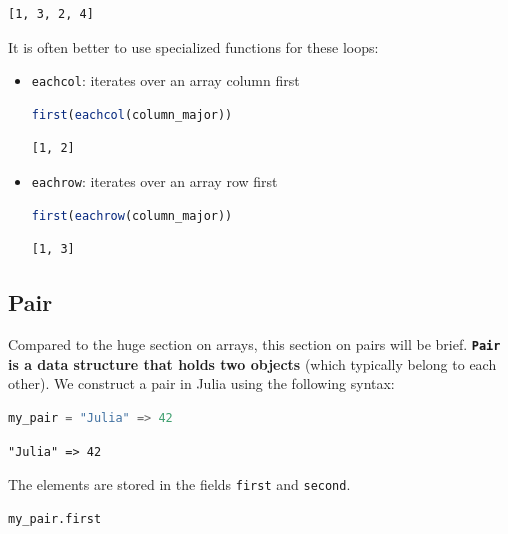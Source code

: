 \documentclass[
  notoc %
]{tufte-book}
\newcommand{\passthrough}[1]{#1}
\begin{document}
\begin{lstlisting}[language=Output]
[1, 3, 2, 4]
\end{lstlisting}

It is often better to use specialized functions for these loops:

\begin{itemize}
\item
  \passthrough{\lstinline!eachcol!}: iterates over an array column first

  \begin{lstlisting}[language=Julia]
  first(eachcol(column_major))
  \end{lstlisting}

  \begin{lstlisting}[language=Output]
  [1, 2]
  \end{lstlisting}
\item
  \passthrough{\lstinline!eachrow!}: iterates over an array row first

  \begin{lstlisting}[language=Julia]
  first(eachrow(column_major))
  \end{lstlisting}

  \begin{lstlisting}[language=Output]
  [1, 3]
  \end{lstlisting}
\end{itemize}

\hypertarget{sec:pair}{%
\subsection{Pair}\label{sec:pair}}

Compared to the huge section on arrays, this section on pairs will be
brief. \textbf{\passthrough{\lstinline!Pair!} is a data structure that
holds two objects} (which typically belong to each other). We construct
a pair in Julia using the following syntax:

\begin{lstlisting}[language=Julia]
my_pair = "Julia" => 42
\end{lstlisting}

\begin{lstlisting}[language=Output]
"Julia" => 42
\end{lstlisting}

The elements are stored in the fields \passthrough{\lstinline!first!}
and \passthrough{\lstinline!second!}.

\begin{lstlisting}[language=Julia]
my_pair.first
\end{lstlisting}
\end{document}
